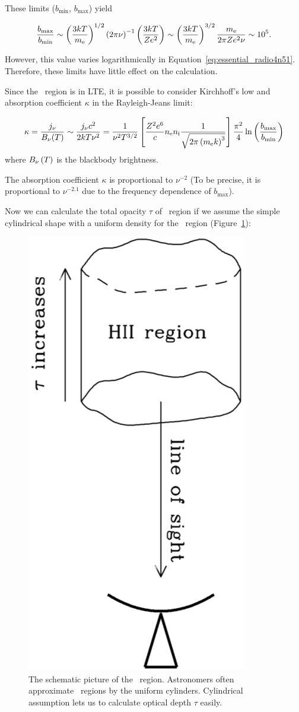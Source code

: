 These limits ($b_{\min}$, $b_{\max}$) yield

\begin{equation}\label{eq:essential_radio4n49}
    \frac{b_{\max }}{b_{\min }} \sim \left(\frac{3 k T}{m_{\mathrm{e}}}\right)^{1 / 2}\left(2 \pi \nu\right)^{-1}\left(\frac{3 k T}{Z e^{2}}\right) \sim \left(\frac{3 k T}{m_{\mathrm{e}}}\right)^{3 / 2} \frac{m_{\mathrm{e}}}{2 \pi Z e^{2} \nu} \sim 10^5.
\end{equation}

However, this value varies logarithmically in Equation~\ref{eq:essential_radio4n51}.
Therefore, these limits have little effect on the calculation.

Since the \ih~region is in LTE, it is possible to consider Kirchhoff's low and absorption coefficient $\kappa$ in the Rayleigh-Jeans limit:

\begin{equation}\label{eq:essential_radio4n51}
    \kappa=\frac{j_{\nu}}{B_{\nu}(T)} \sim \frac{j_{\nu} c^2}{2 k T \nu^2} = \frac{1}{\nu^2 T^{3/2}}\left[\frac{Z^2 e^6}{c} n_{\mathrm{e}} n_{\mathrm{i}} \frac{1}{\sqrt{2\pi\left(m_{\mathrm{e}} k\right)^3}}\right] \frac{\pi^2}{4} \ln \left(\frac{b_{\max}}{b_{\min}}\right)
\end{equation}
where $B_{\nu}\left(T\right)$ is the blackbody brightness.

The absorption coefficient $\kappa$ is proportional to $\nu^{-2}$ (To be precise, it is proportional to $\nu^{-2.1}$ due to the frequency dependence of $b_{\max}$).

Now we can calculate the total opacity $\tau$ of \ih~region if we assume the simple cylindrical shape with a uniform density for the \ih~region (Figure~\ref{fig:nrao_radio4n7}):

\begin{figure}[htbp]
	\centering
	\includegraphics[width=.4\linewidth]{Chapter_2/Figures/NRAO_radio4n7.png}
    \caption[The schematic picture of \ih~region]{\label{fig:nrao_radio4n7}
        The schematic picture of the \ih~region.
        Astronomers often approximate \ih~regions by the uniform cylinders.
        Cylindrical assumption lets us to calculate optical depth $\tau$ easily.
    }
\end{figure}

